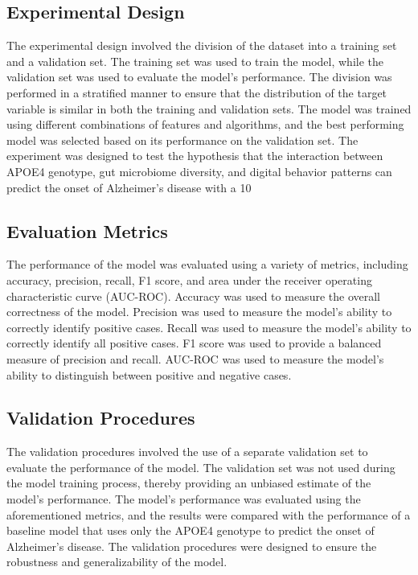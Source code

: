 \documentclass[conference]{IEEEtran}
\begin{document}
\subsection{Experimental Design}
The experimental design involved the division of the dataset into a training set and a validation set. The training set was used to train the model, while the validation set was used to evaluate the model's performance. The division was performed in a stratified manner to ensure that the distribution of the target variable is similar in both the training and validation sets. The model was trained using different combinations of features and algorithms, and the best performing model was selected based on its performance on the validation set. The experiment was designed to test the hypothesis that the interaction between APOE4 genotype, gut microbiome diversity, and digital behavior patterns can predict the onset of Alzheimer's disease with a 10%

\subsection{Evaluation Metrics}
The performance of the model was evaluated using a variety of metrics, including accuracy, precision, recall, F1 score, and area under the receiver operating characteristic curve (AUC-ROC). Accuracy was used to measure the overall correctness of the model. Precision was used to measure the model's ability to correctly identify positive cases. Recall was used to measure the model's ability to correctly identify all positive cases. F1 score was used to provide a balanced measure of precision and recall. AUC-ROC was used to measure the model's ability to distinguish between positive and negative cases.

\subsection{Validation Procedures}
The validation procedures involved the use of a separate validation set to evaluate the performance of the model. The validation set was not used during the model training process, thereby providing an unbiased estimate of the model's performance. The model's performance was evaluated using the aforementioned metrics, and the results were compared with the performance of a baseline model that uses only the APOE4 genotype to predict the onset of Alzheimer's disease. The validation procedures were designed to ensure the robustness and generalizability of the model.
\end{document}
